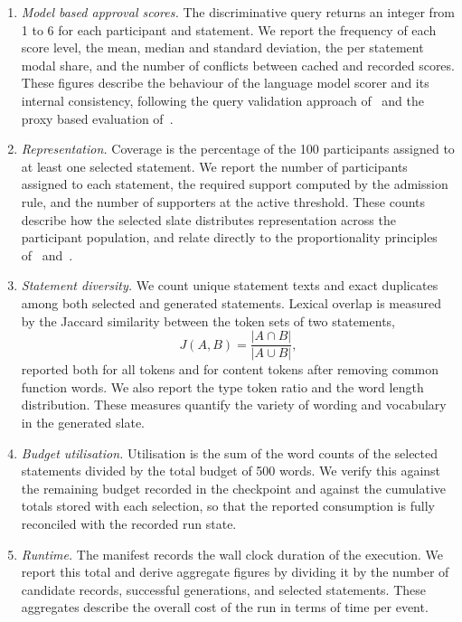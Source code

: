 \documentclass[letterpaper,11pt]{article}
\theoremstyle{plain}
\theoremstyle{definition}
\begin{document}
\begin{enumerate}
\item \emph{Model based approval scores.}
The discriminative query returns an integer from 1 to 6 for each participant and statement. We report the frequency of each score level, the mean, median and standard deviation, the per statement modal share, and the number of conflicts between cached and recorded scores. These figures describe the behaviour of the language model scorer and its internal consistency, following the query validation approach of~\citet{fish2026gsc} and the proxy based evaluation of~\citet{boehmer2025nextgen}. \smallskip

\item \emph{Representation.}
Coverage is the percentage of the 100 participants assigned to at least one selected statement. We report the number of participants assigned to each statement, the required support computed by the admission rule, and the number of supporters at the active threshold. These counts describe how the selected slate distributes representation across the participant population, and relate directly to the proportionality principles of~\citet{aziz2017jr} and~\citet{boehmer2025nextgen}. \smallskip

\item \emph{Statement diversity.}
We count unique statement texts and exact duplicates among both selected and generated statements. Lexical overlap is measured by the Jaccard similarity between the token sets of two statements,
\begin{equation}
J(A,B) = \frac{|A \cap B|}{|A \cup B|},
\end{equation}
reported both for all tokens and for content tokens after removing common function words. We also report the type token ratio and the word length distribution. These measures quantify the variety of wording and vocabulary in the generated slate. \smallskip

\item \emph{Budget utilisation.}
Utilisation is the sum of the word counts of the selected statements divided by the total budget of 500 words. We verify this against the remaining budget recorded in the checkpoint and against the cumulative totals stored with each selection, so that the reported consumption is fully reconciled with the recorded run state. \smallskip

\item \emph{Runtime.}
The manifest records the wall clock duration of the execution. We report this total and derive aggregate figures by dividing it by the number of candidate records, successful generations, and selected statements. These aggregates describe the overall cost of the run in terms of time per event.
\end{enumerate}
\end{document}
